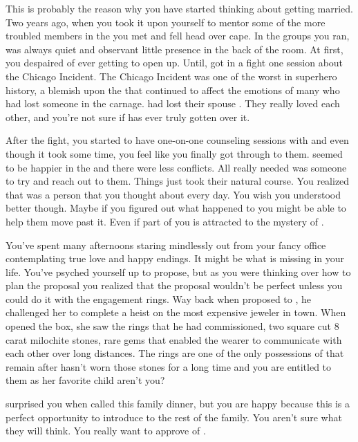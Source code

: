 \documentclass[char]{LRSguildcamp1}
\begin{document}
This is probably the reason why you have started thinking about getting married. Two years ago, when you took it upon yourself to mentor some of the more troubled members in the \cHeroLeague{} you met \cYS{} and fell head over cape. In the groups you ran, \cYS{\they} was always quiet and observant little presence in the back of the room. At first, you despaired of ever getting \cYS{\them} to open up. Until, \cYS{\they} got in a fight one session about the Chicago Incident. The Chicago Incident was one of the worst in superhero history, a blemish upon the \cHeroLeague{} that continued to affect the emotions of many who had lost someone in the carnage. \cArchitect{} had lost their spouse \cAS{\intro}. They really loved each other, and you're not sure if \cArchitect{\they} has ever truly gotten over it. 

After the fight, you started to have one-on-one counseling sessions with \cYS{} and even though it took some time, you feel like you finally got through to them. \cYS{} seemed to be happier in the \cHeroLeague{} and there were less conflicts.  All \cYS{\they} really needed was someone to try and reach out to them. Things just took their natural course. You realized that \cYS{\they} was a person that you thought about every day. You wish you understood \cYS{\them} better though. Maybe if you figured out what happened to \cYS{\them} you might be able to help them move past it.  Even if part of you is attracted to the mystery of \cYS{\them}. 
 
You've spent many afternoons staring mindlessly out from your fancy \cHeroLeague{} office contemplating true love and happy endings. It might be what is missing in your life. You've psyched yourself up to propose, but as you were thinking over how to plan the proposal you realized that the proposal wouldn't be perfect unless you could do it with the engagement rings. Way back when \cGS{\parent} proposed to \cGrandma{\parent}, he challenged her to complete a heist on the most expensive jeweler in town. When \cGrandma{\they} opened the box, she saw the rings that he had commissioned, two square cut 8 carat milochite stones, rare gems that enabled the wearer to communicate with each other over long distances. The rings are one of the only possessions of \cGS{\parent} that remain after \cGS{\their} \cGrandma{\they} hasn't worn those stones for a long time and you are entitled to them as her favorite child aren't you? 

 \cGrandma{\parent} surprised you when \cGrandma{\they} called this family dinner, but you are happy because this is a perfect opportunity to introduce \cYS{} to the rest of the family. You aren't sure what they will think. You really want \cGrandma{\parent} to approve of \cYS{}. 
\end{document}
